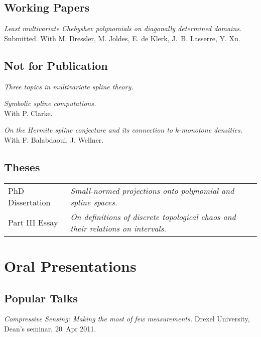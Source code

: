 \documentclass[11pt]{article}
\begin{document}
\subsection{Working Papers}
\betaremune
\item {\sl Least multivariate Chebyshev polynomials on diagonally determined domains}.\\
Submitted. With M.  Dressler, M.  Joldes, E. de Klerk, J.~B. Lasserre,  Y. Xu.
\eetaremune

\subsection{Not for Publication}
\betaremune
\item {\sl Three topics in multivariate spline theory.}
\item {\sl Symbolic spline computations.}\\
 With P. Clarke.
\item {\sl On the Hermite spline conjecture and its connection to $k$-monotone densities.}\\
With F. Balabdaoui, J. Wellner.
\eetaremune

\subsection{Theses}
\begin{tabular}{ll}
PhD Dissertation & {\sl Small-normed projections onto polynomial and spline spaces.}\\
Part III Essay & {\sl On definitions of discrete topological chaos and their relations on intervals.}
\end{tabular}


\section{Oral Presentations}

\subsection{Popular Talks}
\betaremune
\item {\sl Compressive Sensing: Making the most of few measurements.}
Drexel University, Dean's seminar, 20~Apr 2011.
\eetaremune
\end{document}
